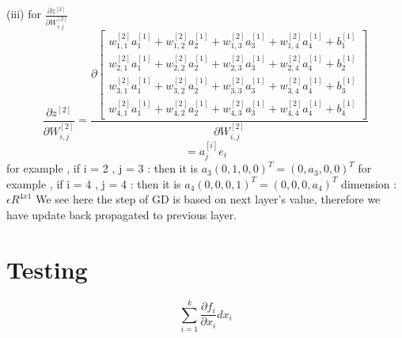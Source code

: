 \documentclass{article}
\begin{document}
(iii) for \( \frac{\partial z^{[2]} }{\partial W_{i,j}^{[2]}} \) \newline
\[
\frac{\partial z^{[2]} }{\partial W_{i,j}^{[2]}}
=\frac{ \partial \begin{bmatrix}
w_{1,1}^{[2]}a_1^{[1]}+w_{1,2}^{[2]}a_2^{[1]}+w_{1,3}^{[2]}a_3^{[1]}+w_{1,4}^{[2]}a_4^{[1]} + b_1^{[1]}\\
w_{2,1}^{[2]}a_1^{[1]}+w_{2,2}^{[2]}a_2^{[1]}+w_{2,3}^{[2]}a_3^{[1]}+w_{2,4}^{[2]}a_4^{[1]} + b_2^{[1]}\\
w_{3,1}^{[2]}a_1^{[1]}+w_{3,2}^{[2]}a_2^{[1]}+w_{3,3}^{[2]}a_3^{[1]}+w_{3,4}^{[2]}a_4^{[1]} + b_3^{[1]}\\
w_{4,1}^{[2]}a_1^{[1]}+w_{4,2}^{[2]}a_2^{[1]}+w_{4,3}^{[2]}a_3^{[1]}+w_{4,4}^{[2]}a_4^{[1]} + b_4^{[1]}
\end{bmatrix} } {\partial W_{i,j}^{[2]}} 
\]
\[
= a_j^{[i]}e_i
\]
for example , if i = 2 , j = 3 : then it is \(a_3 (0,1,0,0)^T=(0,a_3,0,0)^T\) \newline
for example , if i = 4 , j = 4 : then it is \(a_4 (0,0,0,1)^T=(0,0,0,a_4)^T\) \newline
dimension :   \( \epsilon R^{4x1} \)  \newline \newline
We see here the step of GD is based on next layer's value, therefore we have update back propagated to previous layer.
\section{Testing}
\[
\sum_{i=1}^k \frac{\partial f_i}{\partial x_i} dx_i
\]
\end{document}
